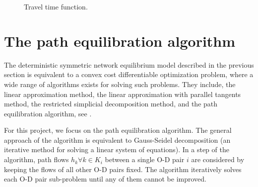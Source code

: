 \begin{figure}[H]
    \centering
    \caption{Travel time function.}
    \label{fig:flowfunction}
\end{figure}

\section{The path equilibration algorithm}
The deterministic symmetric network equilibrium model described in the previous section is equivalent to a convex cost differentiable optimization problem,
where a wide range of algorithms exists for solving such problems.
They include, the linear approximation method,
the linear approximation with parallel tangents method,
the restricted simplicial decomposition method,
and the path equilibration algorithm,
see \citet{Florian}.

For this project,
we focus on the path equilibration algorithm.
The general approach of the algorithm is equivalent to
Gauss-Seidel decomposition (an iterative method for solving a linear system of equations).
In a step of the algorithm,
path flows $h_k \forall k \in K_i$ between a single O-D pair $i$ are considered by keeping the flows of all other O-D pairs fixed.
The algorithm iteratively solves each O-D pair sub-problem until any of them cannot be improved.

